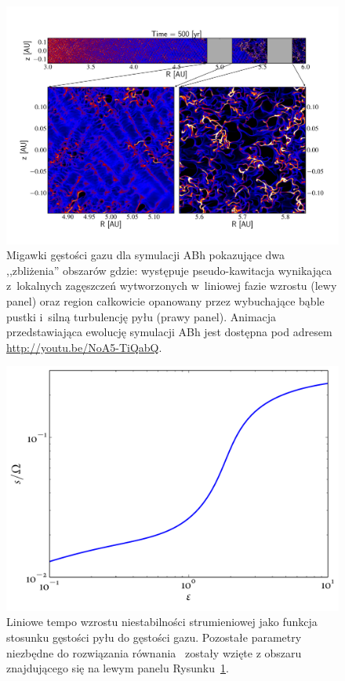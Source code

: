 \begin{figure} 
\centering
\includegraphics[width=0.98\linewidth]{figures/fig3}
\caption[Kawitacja w symulacji ABh.]
  {Migawki gęstości gazu dla symulacji ABh pokazujące dwa ,,zbliżenia''
   obszarów gdzie: występuje pseudo-kawitacja wynikająca z~lokalnych zagęszczeń
   wytworzonych w~liniowej fazie wzrostu (lewy panel) oraz region całkowicie
   opanowany przez wybuchające bąble pustki i~silną turbulencję pyłu (prawy
   panel). Animacja przedstawiająca ewolucję symulacji ABh jest dostępna pod
   adresem \href{http://youtu.be/NoA5-TiQabQ}{http://youtu.be/NoA5-TiQabQ}.}
\label{fig3}
\end{figure}

\begin{figure}
   \centering
   \includegraphics[width=0.5\linewidth]{figures/growthAB}
   \caption[Liniowe tempo wzrostu niestabilności strumieniowej w funkcji
   $\epsilon$.]
     {Liniowe tempo wzrostu niestabilności strumieniowej jako funkcja
      stosunku gęstości pyłu do gęstości gazu. Pozostałe parametry niezbędne do
      rozwiązania równania~ zostały wzięte z obszaru znajdującego
      się na lewym panelu Rysunku~\ref{fig3}.}
   \label{fig2b}
\end{figure}


